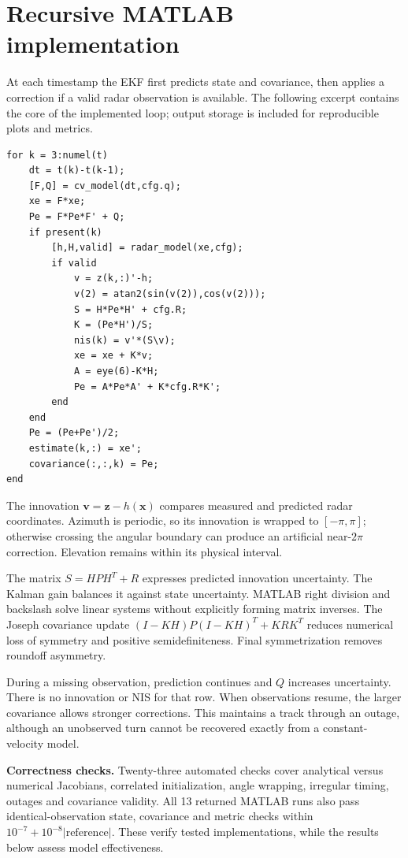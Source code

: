 \documentclass[12pt,a4paper]{article}
\begin{document}
\section{Recursive MATLAB implementation}
At each timestamp the EKF first predicts state and covariance, then applies a correction if a valid radar observation is available. The following excerpt contains the core of the implemented loop; output storage is included for reproducible plots and metrics.
\begin{lstlisting}
for k = 3:numel(t)
    dt = t(k)-t(k-1);
    [F,Q] = cv_model(dt,cfg.q);
    xe = F*xe;
    Pe = F*Pe*F' + Q;
    if present(k)
        [h,H,valid] = radar_model(xe,cfg);
        if valid
            v = z(k,:)'-h;
            v(2) = atan2(sin(v(2)),cos(v(2)));
            S = H*Pe*H' + cfg.R;
            K = (Pe*H')/S;
            nis(k) = v'*(S\v);
            xe = xe + K*v;
            A = eye(6)-K*H;
            Pe = A*Pe*A' + K*cfg.R*K';
        end
    end
    Pe = (Pe+Pe')/2;
    estimate(k,:) = xe';
    covariance(:,:,k) = Pe;
end
\end{lstlisting}
The innovation $\mathbf{v}=\mathbf{z}-h(\mathbf{x})$ compares measured and predicted radar coordinates. Azimuth is periodic, so its innovation is wrapped to $[-\pi,\pi]$; otherwise crossing the angular boundary can produce an artificial near-$2\pi$ correction. Elevation remains within its physical interval.

The matrix $S=HPH^T+R$ expresses predicted innovation uncertainty. The Kalman gain balances it against state uncertainty. MATLAB right division and backslash solve linear systems without explicitly forming matrix inverses. The Joseph covariance update $(I-KH)P(I-KH)^T+KRK^T$ reduces numerical loss of symmetry and positive semidefiniteness. Final symmetrization removes roundoff asymmetry.

During a missing observation, prediction continues and $Q$ increases uncertainty. There is no innovation or NIS for that row. When observations resume, the larger covariance allows stronger corrections. This maintains a track through an outage, although an unobserved turn cannot be recovered exactly from a constant-velocity model.

\textbf{Correctness checks.} Twenty-three automated checks cover analytical versus numerical Jacobians, correlated initialization, angle wrapping, irregular timing, outages and covariance validity. All 13 returned MATLAB runs also pass identical-observation state, covariance and metric checks within $10^{-7}+10^{-8}|\mathrm{reference}|$. These verify tested implementations, while the results below assess model effectiveness.
\clearpage
\end{document}
